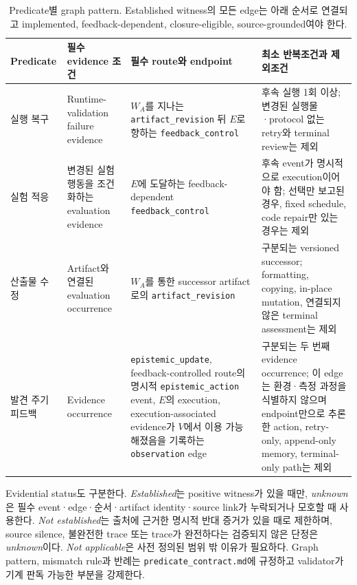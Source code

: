 \documentclass[11pt]{article}
\begin{document}
\begin{table}[t]
\centering
\footnotesize
\setlength{\tabcolsep}{4pt}
\caption{Predicate별 graph pattern. Established witness의 모든 edge는 아래 순서로 연결되고 implemented, feedback-dependent, closure-eligible, source-grounded여야 한다.}
\label{tab:predicate-patterns}
\begin{tabular}{p{}p{}p{}p{}}
\toprule
Predicate & 필수 evidence 조건 & 필수 route와 endpoint & 최소 반복조건과 제외조건 \\
\midrule
실행 복구 & Runtime-validation failure evidence & $W_A$를 지나는 \texttt{artifact\_revision} 뒤 $E$로 향하는 \texttt{feedback\_control} & 후속 실행 1회 이상; 변경된 실행물·protocol 없는 retry와 terminal review는 제외 \\
실험 적응 & 변경된 실험 행동을 조건화하는 evaluation evidence & $E$에 도달하는 feedback-dependent \texttt{feedback\_control} & 후속 event가 명시적으로 execution이어야 함; 선택만 보고된 경우, fixed schedule, code repair만 있는 경우는 제외 \\
산출물 수정 & Artifact와 연결된 evaluation occurrence & $W_A$를 통한 successor artifact로의 \texttt{artifact\_revision} & 구분되는 versioned successor; formatting, copying, in-place mutation, 연결되지 않은 terminal assessment는 제외 \\
발견 주기 피드백 & Evidence occurrence & \texttt{epistemic\_update}, feedback-controlled route의 명시적 \texttt{epistemic\_action} event, $E$의 execution, execution-associated evidence가 $V$에서 이용 가능해졌음을 기록하는 \texttt{observation} edge & 구분되는 두 번째 evidence occurrence; 이 edge는 환경·측정 과정을 식별하지 않으며 endpoint만으로 추론한 action, retry-only, append-only memory, terminal-only path는 제외 \\
\bottomrule
\end{tabular}
\end{table}

Evidential status도 구분한다. \emph{Established}는 positive witness가 있을 때만, \emph{unknown}은 필수 event·edge·순서·artifact identity·source link가 누락되거나 모호할 때 사용한다. \emph{Not established}는 출처에 근거한 명시적 반대 증거가 있을 때로 제한하며, source silence, 불완전한 trace 또는 trace가 완전하다는 검증되지 않은 단정은 \emph{unknown}이다. \emph{Not applicable}은 사전 정의된 범위 밖 이유가 필요하다. Graph pattern, mismatch rule과 반례는 \texttt{predicate\_contract.md}에 규정하고 validator가 기계 판독 가능한 부분을 강제한다.
\end{document}
